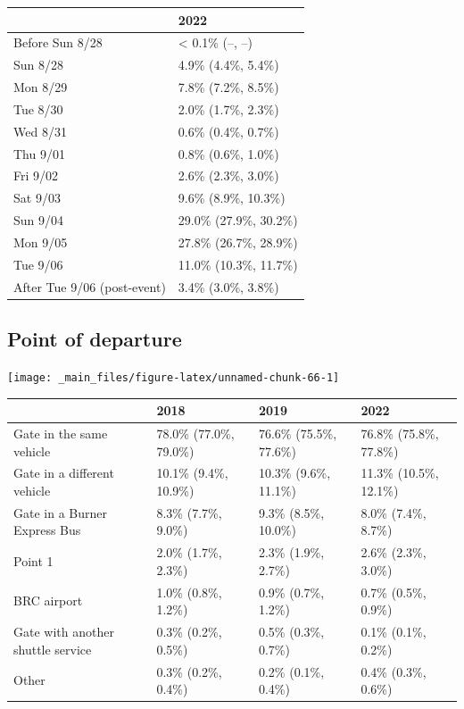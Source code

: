 \documentclass[
]{book}
\begin{document}
\begin{table}
\centering
\begin{tabular}[t]{>{}l|>{}l}
\hline
  & 2022\\
\hline
Before Sun 8/28 & < 0.1\% (--, --)\\
\hline
Sun 8/28 & 4.9\% (4.4\%, 5.4\%)\\
\hline
Mon 8/29 & 7.8\% (7.2\%, 8.5\%)\\
\hline
Tue 8/30 & 2.0\% (1.7\%, 2.3\%)\\
\hline
Wed 8/31 & 0.6\% (0.4\%, 0.7\%)\\
\hline
Thu 9/01 & 0.8\% (0.6\%, 1.0\%)\\
\hline
Fri 9/02 & 2.6\% (2.3\%, 3.0\%)\\
\hline
Sat 9/03 & 9.6\% (8.9\%, 10.3\%)\\
\hline
Sun 9/04 & 29.0\% (27.9\%, 30.2\%)\\
\hline
Mon 9/05 & 27.8\% (26.7\%, 28.9\%)\\
\hline
Tue 9/06 & 11.0\% (10.3\%, 11.7\%)\\
\hline
After Tue 9/06 (post-event) & 3.4\% (3.0\%, 3.8\%)\\
\hline
\end{tabular}
\end{table}

\hypertarget{point-of-departure}{%
\subsection{Point of departure}\label{point-of-departure}}

\texttt{[image: \_main\_files/figure-latex/unnamed-chunk-66-1]}

\begin{table}
\centering
\begin{tabular}[t]{>{}l|>{}l|>{}l|>{}l}
\hline
  & 2018 & 2019 & 2022\\
\hline
Gate in the same vehicle & 78.0\% (77.0\%, 79.0\%) & 76.6\% (75.5\%, 77.6\%) & 76.8\% (75.8\%, 77.8\%)\\
\hline
Gate in a different vehicle & 10.1\% (9.4\%, 10.9\%) & 10.3\% (9.6\%, 11.1\%) & 11.3\% (10.5\%, 12.1\%)\\
\hline
Gate in a Burner Express Bus & 8.3\% (7.7\%, 9.0\%) & 9.3\% (8.5\%, 10.0\%) & 8.0\% (7.4\%, 8.7\%)\\
\hline
Point 1 & 2.0\% (1.7\%, 2.3\%) & 2.3\% (1.9\%, 2.7\%) & 2.6\% (2.3\%, 3.0\%)\\
\hline
BRC airport & 1.0\% (0.8\%, 1.2\%) & 0.9\% (0.7\%, 1.2\%) & 0.7\% (0.5\%, 0.9\%)\\
\hline
Gate with another shuttle service & 0.3\% (0.2\%, 0.5\%) & 0.5\% (0.3\%, 0.7\%) & 0.1\% (0.1\%, 0.2\%)\\
\hline
Other & 0.3\% (0.2\%, 0.4\%) & 0.2\% (0.1\%, 0.4\%) & 0.4\% (0.3\%, 0.6\%)\\
\hline
\end{tabular}
\end{table}
\end{document}
